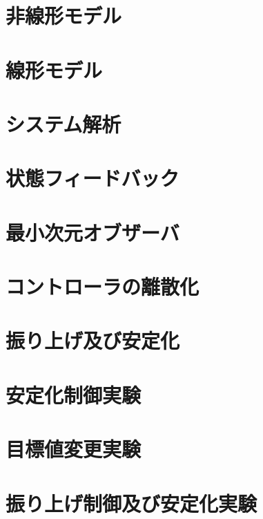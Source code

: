 \section{非線形モデル}
\section{線形モデル}
\section{システム解析}
\section{状態フィードバック}
\section{最小次元オブザーバ}
\section{コントローラの離散化}
\section{振り上げ及び安定化}
\section{安定化制御実験}
\section{目標値変更実験}
\section{振り上げ制御及び安定化実験}
